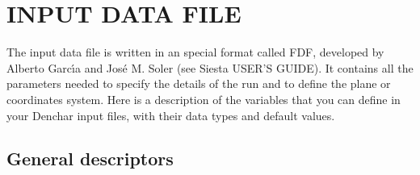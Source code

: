 \section{INPUT DATA FILE}
\label{cap:input} 

The input data file is written in an special format called FDF, developed
by Alberto Garc\'{\i}a and Jos\'e M. Soler (see {\sc Siesta} USER'S GUIDE).
It contains all the parameters needed to specify the details
of the run and to define the plane or coordinates system.
Here is a description of the variables that you can define in your 
{\sc Denchar} input files,
with their data types and default values.

\vspace{5pt}
\subsection{General descriptors}

